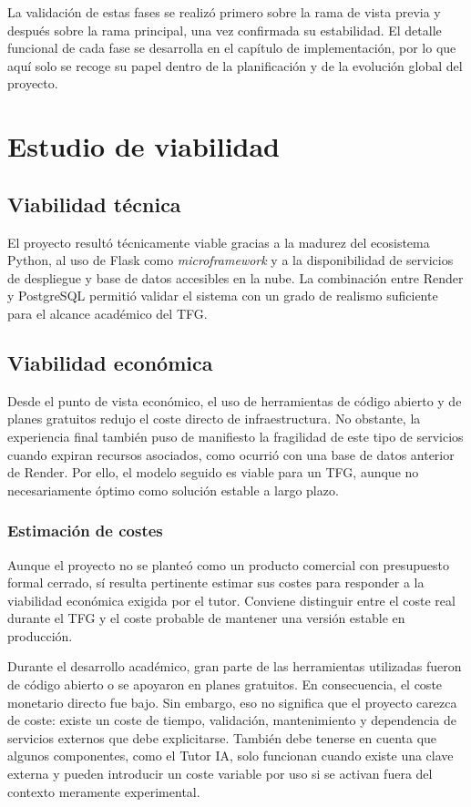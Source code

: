 La validación de estas fases se realizó primero sobre la rama de vista previa y después sobre la rama principal, una vez confirmada su estabilidad. El detalle funcional de cada fase se desarrolla en el capítulo de implementación, por lo que aquí solo se recoge su papel dentro de la planificación y de la evolución global del proyecto.

\section{Estudio de viabilidad}

\subsection{Viabilidad técnica}

El proyecto resultó técnicamente viable gracias a la madurez del ecosistema Python, al uso de Flask como \textit{microframework} y a la disponibilidad de servicios de despliegue y base de datos accesibles en la nube. La combinación entre Render y PostgreSQL permitió validar el sistema con un grado de realismo suficiente para el alcance académico del TFG.

\subsection{Viabilidad económica}

Desde el punto de vista económico, el uso de herramientas de código abierto y de planes gratuitos redujo el coste directo de infraestructura. No obstante, la experiencia final también puso de manifiesto la fragilidad de este tipo de servicios cuando expiran recursos asociados, como ocurrió con una base de datos anterior de Render. Por ello, el modelo seguido es viable para un TFG, aunque no necesariamente óptimo como solución estable a largo plazo.

\subsubsection{Estimación de costes}

Aunque el proyecto no se planteó como un producto comercial con presupuesto formal cerrado, sí resulta pertinente estimar sus costes para responder a la viabilidad económica exigida por el tutor. Conviene distinguir entre el coste real durante el TFG y el coste probable de mantener una versión estable en producción.

Durante el desarrollo académico, gran parte de las herramientas utilizadas fueron de código abierto o se apoyaron en planes gratuitos. En consecuencia, el coste monetario directo fue bajo. Sin embargo, eso no significa que el proyecto carezca de coste: existe un coste de tiempo, validación, mantenimiento y dependencia de servicios externos que debe explicitarse. También debe tenerse en cuenta que algunos componentes, como el Tutor IA, solo funcionan cuando existe una clave externa y pueden introducir un coste variable por uso si se activan fuera del contexto meramente experimental.

